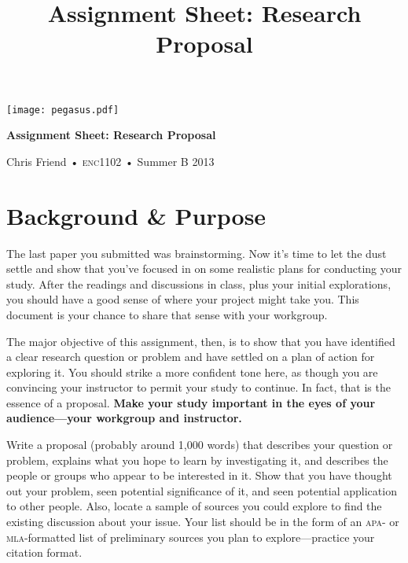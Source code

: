 \documentclass[12pt, oneside]{amsart}	%
\title[Research Proposal]{Assignment Sheet: Research Proposal}
\begin{document}
%
\thispagestyle{empty}

\vspace{-2in}
\begin{center}
\huge
\texttt{[image: pegasus.pdf]}

\textbf{Assignment Sheet: Research Proposal}

{\normalsize Chris Friend • \textsc{enc1102} • Summer B 2013}
\end{center}
\vspace{1.5\baselineskip}

\section{Background \& Purpose} %
\label{sec:background}
The last paper you submitted was brainstorming. Now it's time to let the dust settle and show that you've focused in on some realistic plans for conducting your study. After the readings and discussions in class, plus your initial explorations, you should have a good sense of where your project might take you. This document is your chance to share that sense with your workgroup.

The major objective of this assignment, then, is to show that you have identified a clear research question or problem and have settled on a plan of action for exploring it. You should strike a more confident tone here, as though you are convincing your instructor to permit your study to continue. In fact, that is the essence of a proposal. \textbf{Make your study important in the eyes of your audience—your workgroup and instructor.}

Write a proposal (probably around 1,000 words) that describes your question or problem, explains what you hope to learn by investigating it, and describes the people or groups who appear to be interested in it. Show that you have thought out your problem, seen potential significance of it, and seen potential application to other people. Also, locate a sample of sources you could explore to find the existing discussion about your issue. Your list should be in the form of an \textsc{apa}- or \textsc{mla}-formatted list of preliminary sources you plan to explore---practice your citation format.
\end{document}
